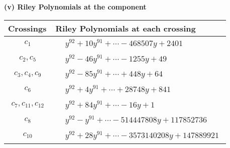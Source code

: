 \documentclass[1p]{elsarticle_modified}
\theoremstyle{definition}
\begin{document}
\newpage\renewcommand{\arraystretch}{1}
\flushleft \textbf{(v) Riley Polynomials at the component}\newline \\
\begin{tabular}{m{50pt}|m{274pt}}
Crossings & \hspace{64pt}Riley Polynomials at each crossing \\
\hline $$\begin{aligned}c_{1}\end{aligned}$$&$\begin{aligned}
&y^{92}+10 y^{91}+\cdots-468507 y+2401
\end{aligned}$\\
\hline $$\begin{aligned}c_{2},c_{5}\end{aligned}$$&$\begin{aligned}
&y^{92}-46 y^{91}+\cdots-1255 y+49
\end{aligned}$\\
\hline $$\begin{aligned}c_{3},c_{4},c_{9}\end{aligned}$$&$\begin{aligned}
&y^{92}-85 y^{91}+\cdots+448 y+64
\end{aligned}$\\
\hline $$\begin{aligned}c_{6}\end{aligned}$$&$\begin{aligned}
&y^{92}+4 y^{91}+\cdots+28748 y+841
\end{aligned}$\\
\hline $$\begin{aligned}c_{7},c_{11},c_{12}\end{aligned}$$&$\begin{aligned}
&y^{92}+84 y^{91}+\cdots-16 y+1
\end{aligned}$\\
\hline $$\begin{aligned}c_{8}\end{aligned}$$&$\begin{aligned}
&y^{92}- y^{91}+\cdots-514447808 y+117852736
\end{aligned}$\\
\hline $$\begin{aligned}c_{10}\end{aligned}$$&$\begin{aligned}
&y^{92}+28 y^{91}+\cdots-3573140208 y+147889921
\end{aligned}$\\
\hline
\end{tabular}\\~\\
\end{document}
